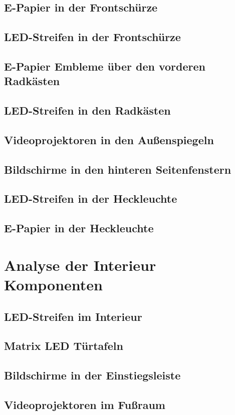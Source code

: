 \subsection{E-Papier in der Frontschürze}
\subsection{LED-Streifen in der Frontschürze}
\subsection{E-Papier Embleme über den vorderen Radkästen}
\subsection{LED-Streifen in den Radkästen}
\subsection{Videoprojektoren in den Außenspiegeln}
\subsection{Bildschirme in den hinteren Seitenfenstern}
\subsection{LED-Streifen in der Heckleuchte}
\subsection{E-Papier in der Heckleuchte}
\section{Analyse der Interieur Komponenten}
\subsection{LED-Streifen im Interieur}
\subsection{Matrix LED Türtafeln}
\subsection{Bildschirme in der Einstiegsleiste}
\subsection{Videoprojektoren im Fußraum}
